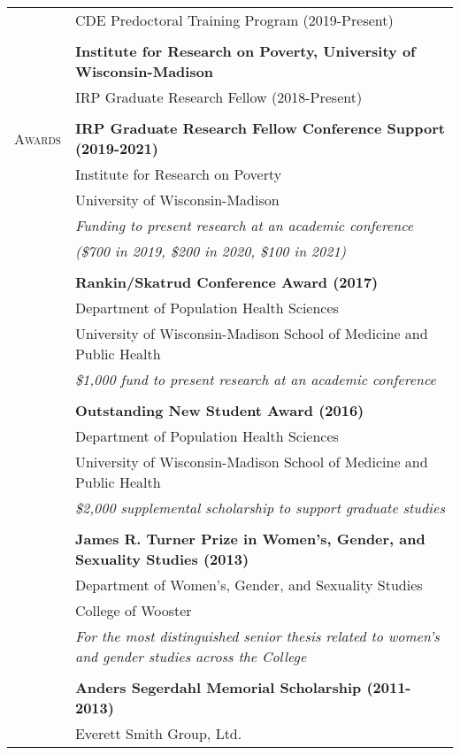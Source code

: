 \documentclass[letterpaper,10pt,oneside]{article}
\begin{document}
\begin{longtable}{@{} p{} p{}}
     & CDE Predoctoral Training Program (2019-Present) \\
     & \\
     &\textbf{Institute for Research on Poverty, University of Wisconsin-Madison} \\
     & IRP Graduate Research Fellow (2018-Present) \\
     & \\
\textsc{Awards} 
     &\textbf{IRP Graduate Research Fellow Conference Support (2019-2021)} \\
     & Institute for Research on Poverty \\
     & University of Wisconsin-Madison \\
     & \textit{Funding to present research at an academic conference} \\
     & \textit{(\$700 in 2019, \$200 in 2020, \$100 in 2021)} \\
     & \\
     &\textbf{Rankin/Skatrud Conference Award (2017)} \\
     & Department of Population Health Sciences \\
     & University of Wisconsin-Madison School of Medicine and Public Health \\
     & \textit{\$1,000 fund to present research at an academic conference} \\
     & \\
     &\textbf{Outstanding New Student Award (2016)} \\
     & Department of Population Health Sciences \\
     & University of Wisconsin-Madison School of Medicine and Public Health \\
     & \textit{\$2,000 supplemental scholarship to support graduate studies} \\
     & \\
     &\textbf{James R. Turner Prize in Women's, Gender, and Sexuality Studies (2013)} \\
     & Department of Women's, Gender, and Sexuality Studies \\
     & College of Wooster \\
     & \textit{For the most distinguished senior thesis related to women's and gender studies across the College} \\
     & \\
     &\textbf{Anders Segerdahl Memorial Scholarship (2011-2013)} \\
     & Everett Smith Group, Ltd. \\

\end{longtable}
\end{document}

